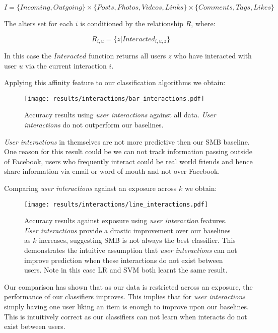 \[ I = \{Incoming, Outgoing\} \times \{Posts,Photos,Videos,Links\} \times \{Comments,Tags,Likes\} \]

The alters set for each $i$ is conditioned by the relationship $R$, where:

\[ R_{i,u} = \{z | Interacted_{i,u,z}\} \]

In this case the $Interacted$ function returns all users $z$ who have interacted with user $u$ via the current interaction $i$.

Applying this affinity feature to our classification algorithms we obtain:

\begin{figure}[tbh!]
	\begin{center}
		\texttt{[image: results/interactions/bar\_interactions.pdf]}
		\caption{Accuracy results using \emph{user interactions} against all data. \emph{User interactions} do not outperform our baselines.}
	\end{center}
\end{figure}

\emph{User interactions} in themselves are not more predictive then our SMB baseline. One reason for this result could be we can 
not track information passing outside of Facebook, users who frequently interact could be real world friends and hence share 
information via email or word of mouth and not over Facebook.

\clearpage

Comparing \emph{user interactions} against an exposure across $k$ we obtain:

\begin{figure}[tbh!]
	\begin{center}
		\texttt{[image: results/interactions/line\_interactions.pdf]}
		\caption{Accuracy results against exposure using \emph{user interaction} features. \emph{User interactions} provide a drastic improvement 
		over our baselines as $k$ increases, suggesting SMB is not always the best classifier. 
		This demonstrates the intuitive assumption that \emph{user interactions} can not improve prediction when these interactions do not exist between users.
		Note in this case LR and SVM both learnt the same result.}
	\end{center}
\end{figure}

Our comparison has shown that as our data is restricted across an exposure, the performance of our classifiers improves.
This implies that for \emph{user interactions} simply having one user liking an item is enough to improve upon our baselines. 
This is intuitively correct as our classifiers can not learn when interacts do not exist between users.

